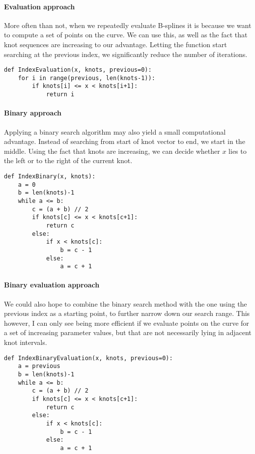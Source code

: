 \documentclass[a4paper]{article}
\begin{document}
    \paragraph{Evaluation approach}
    \label{par:evaluation_approach}
    More often than not, when we repeatedly evaluate B-splines it is because we
    want to compute a set of points on the curve. We can use this, as well as
    the fact that knot sequences are increasing to our advantage. Letting the
    function start searching at the previous index, we significantly reduce the
    number of iterations. 
    \begin{verbatim}
def IndexEvaluation(x, knots, previous=0):
    for i in range(previous, len(knots-1)):
        if knots[i] <= x < knots[i+1]:
            return i
    \end{verbatim}
     
    \paragraph{Binary approach}
    \label{par:binary_approach}
    
    Applying a binary search algorithm may also yield a small computational
    advantage. Instead of searching from start of knot vector to end, we start
    in the middle. Using the fact that knots are increasing, we can decide
    whether $x$ lies to the left or to the right of the current knot.

    \begin{verbatim}
def IndexBinary(x, knots):
    a = 0
    b = len(knots)-1
    while a <= b:
        c = (a + b) // 2
        if knots[c] <= x < knots[c+1]:
            return c
        else:
            if x < knots[c]:
                b = c - 1
            else:
                a = c + 1
    \end{verbatim}

    \paragraph{Binary evaluation approach}
    \label{par:binary_evaluation_approach}
    
    We could also hope to combine the binary search method with the one using
    the previous index as a starting point, to further narrow down our search
    range. This however, I can only see being more efficient if we evaluate
    points on the curve for a set of increasing parameter values, but that
    are not necessarily lying in adjacent knot intervals.
    \begin{verbatim}
def IndexBinaryEvaluation(x, knots, previous=0):
    a = previous
    b = len(knots)-1
    while a <= b:
        c = (a + b) // 2
        if knots[c] <= x < knots[c+1]:
            return c
        else:
            if x < knots[c]:
                b = c - 1
            else:
                a = c + 1
    \end{verbatim}
    
\end{document}
